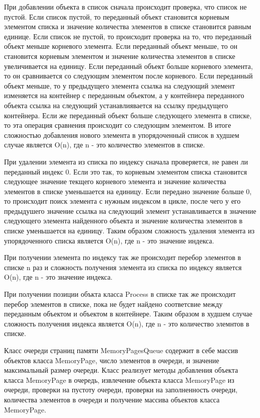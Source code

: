 \documentclass[russian,utf8,simple,hpadding=10mm,vpadding=20mm]{eskdtext}
\begin{document}
При добавлении объекта в список сначала происходит проверка, что список не пустой. Если список пустой, то переданный объект становится корневым элементом списка и значение количества элементов в списке становится равным единице. Если список не пустой, то происходит проверка на то, что переданный объект меньше корневого элемента. Если переданный объект меньше, то он становится корневым элементом и значение количества элементов в списке увеличивается на единицу. Если переданный объект больше корневого элемента, то он сравнивается со следующим элементом после корневого. Если переданный объект меньше, то у предыдущего элемента ссылка на следующий элемент изменяется на контейнер с переданным объектом, а у контейнера переданного объекта ссылка на следующий устанавлиявается на ссылку предыдущего контейнера. Если же переданный объект больше следующего элемента в списке, то эта операция сравнения происходит со следующим элементом. В итоге сложностью добавления нового элемента в упорядоченный список в худшем случае является O(n), где n - это количество элементов в списке.

При удалении элемента из списка по индексу сначала проверяется, не равен ли переданный индекс 0. Если это так, то корневым элементом списка становится следующее значение текщего корневого элемента и значение количества элементов в списке уменьшается на единицу. Если передано значение больше 0, то происходит поиск элемента с нужным индексом в цикле, после чего у его предыдушего значение ссылка на следующий элемент устанавливается в значение следующего элемента найденного объекта и значение количества элементов в списке уменьшается на единицу. Таким образом сложность удаления элемента из упорядоченного списка является O(n), где n - это значение индекса.

При получении элемента по индексу так же происходит перебор элементов в списке n раз и сложность получения элемента из списка по индексу является O(n), где n - это значение индекса.

При получении позиции объкта класса Process в списке  так же происходит перебор элементов в списке, пока не будет найдено соответсвие между переданным объектом и объектом в контейнере. Таким образом в худшем случае сложность получения индекса является O(n), где n - это количество элемнтов в списке.

Класс очереди страниц памяти MemoryPagesQueue содержит в себе массив объектов класса MemoryPage, число элементов в очереди, и значение максимальный размер очереди. Класс реализует методы добавления объекта класса MemoryPage в очередь, извлечение объекта класса MemoryPage из очереди, проверки на пустоту очереди, проверки на заполненность очереди, количества элементов в очереди и получение массива объектов класса MemoryPage.
\end{document}
